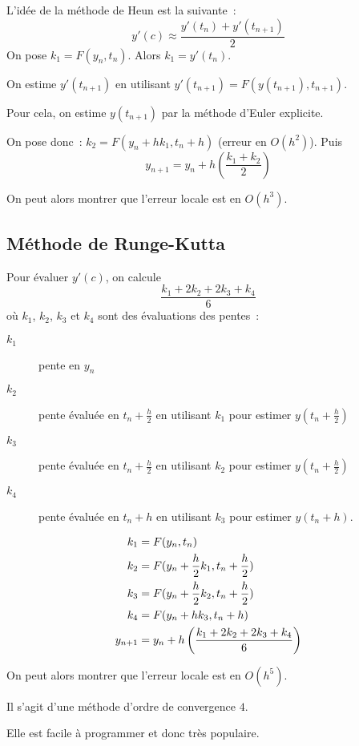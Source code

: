 L'idée de la méthode de Heun est la suivante~:
\begin{equation*}
  y'(c)\approx \frac{y'(t_{n})+y'(t_{n+1})}{2}
\end{equation*}
On pose $\boxed{k_{1} = F(y_{n},t_{n})}$.
Alors $k_{1} = y'(t_{n})$.

On estime $y'(t_{n+1})$ en utilisant $y'(t_{n+1}) = F(y(t_{n+1}),
t_{n+1})$.

Pour cela, on estime $y(t_{n+1})$ par la méthode d'Euler
explicite.

On pose donc~: $\boxed{k_{2} = F(y_{n}+hk_{1},t_{n}+h)}$ (erreur en $O(h^{2})$).
Puis
\begin{equation*}
  \boxed{y_{n+1} = y_{n} + h
\left(
  \frac{k_{1}+k_{2}}{2}
\right)}
\end{equation*}


On peut alors montrer que l'erreur locale est en $O(h^{3})$.


\subsection{Méthode de Runge-Kutta}

Pour évaluer $y'(c)$, on calcule
\begin{equation*}
  \frac{k_{1} + 2 k_{2} + 2 k_{3} + k_{4}}{6}
\end{equation*}
où $k_{1}$, $k_{2}$, $k_{3}$ et $k_{4}$ sont des évaluations des
pentes~:
\begin{description}
\item[$k_{1}$] pente en $y_{n}$
\item[$k_2$] pente évaluée en $t_{n}+\frac{h}{2}$ en utilisant $k_{1}$
  pour estimer $y(t_{n}+\frac{h}{2})$
\item[$k_3$] pente évaluée en $t_{n}+\frac{h}{2}$ en utilisant $k_{2}$
  pour estimer $y(t_{n}+\frac{h}{2})$
\item[$k_4$] pente évaluée en $t_{n}+h$ en utilisant $k_{3}$ pour
  estimer $y(t_{n}+h)$.
\end{description}
\begin{align*}
  k_{1} &= F(y_{n}, t_{n})\\
  k_{2} &= F(y_{n} + \frac{h}{2}k_{1},t_{n} + \frac{h}{2})\\
  k_{3} &= F(y_{n} + \frac{h}{2}k_{2},t_{n}+ \frac{h}{2})\\
  k_{4} &= F(y_{n}+h k_{3},t_{n}+h)\\
  y_{n+1} &= y_{n} +h \left( \frac{k_{1}+2k_{2}+2k_{3}+k_{4}}{6}\right)
\end{align*}

On peut alors montrer que l'erreur locale est en $O(h^{5})$.

Il s'agit d'une méthode d'ordre de convergence $4$.

Elle est facile à programmer et donc très populaire.

%
%
%
%  
